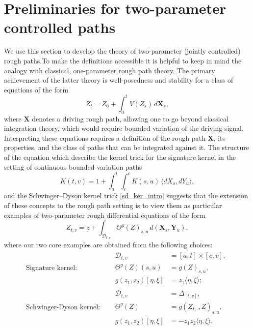 \documentclass{article}%
\begin{document}
\section{Preliminaries for two-parameter controlled paths}
We use this section to develop the theory of two-parameter (jointly controlled) rough paths.To make the definitions accessible it is helpful to keep in mind the analogy with classical, one-parameter rough path theory. The primary achievement of the latter theory is well-posedness and stability for a class of equations of the form
\[
Z_t = Z_0 + \int_{0}^t V(Z_s)\, d\mathbf{X}_s ,
\]
where $\mathbf{X}$ denotes a driving rough path, allowing one to go beyond classical integration theory, which would require bounded variation of the driving signal. Interpreting these equations requires a definition of the rough path $\mathbf{X}$, its properties, and the class of paths that can be integrated against it. The structure of the equation which describe the kernel trick for the signature kernel in the setting of continuous bounded variation paths 
\begin{equation}\label{sig_ker_intro__}
K(t,v) = 1 + \int_a^t \int_c^v K(s,u)\, \langle dX_s, dY_u \rangle,
\end{equation} 
and the Schwinger–Dyson kernel trick \eqref{sd_ker_intro} suggests that the extension of these concepts to the rough path setting is to view them as particular examples of two-parameter rough differential equations of the form
\begin{equation}\label{skeleton_equation}
Z_{t,v}
= z
+ \int_{\mathcal{D}_{t,v}}
\Theta^g\left(Z\right)_{s,u}
\, d(\mathbf{X}_s, \mathbf{Y}_u),
\end{equation}
where our two core examples are obtained from the following choices:
\[
\begin{aligned}
\text{Signature kernel:}\quad
&\begin{aligned}
\mathcal{D}_{t,v} &= [a,t]\times[c,v], \\
\Theta^g(Z)(s,u) &= g(Z)_{s,u}, \\
g(z_1,z_2)[\eta,\xi] &= z_1 \langle \eta,\xi\rangle ;
\end{aligned}
\\[8pt]
\text{Schwinger-Dyson  kernel:}\quad
&\begin{aligned}
\mathcal{D}_{t,v} &= \Delta_{[t,v]}, \\
\Theta^g(Z) &= g(Z_{t, \cdot},Z)_{s,u}, \\
g(z_1,z_2)[\eta,\xi] &= -z_1 z_2 \langle \eta,\xi\rangle .
\end{aligned}
\end{aligned}
\]
\end{document}
